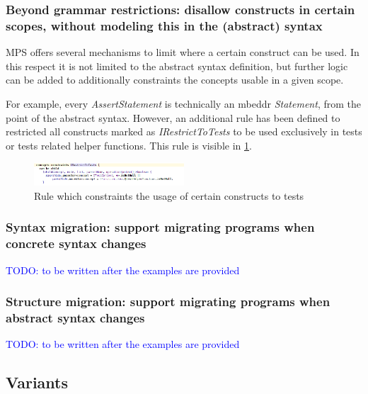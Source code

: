 \documentclass[preprint,numbers,10pt]{sigplanconf}
\newcommand\comment[1]{\textcolor{blue}{#1}}
\begin{document}
\subsubsection{Beyond grammar restrictions: disallow constructs in certain scopes, without modeling this in the (abstract) syntax}
\label{evr:beyondgrammar}

MPS offers several mechanisms to limit where a certain construct can be used. In this respect it is not limited to the abstract syntax definition, but further logic can be added to additionally constraints the concepts usable in a given scope.

For example, every \emph{AssertStatement} is technically an mbeddr \emph{Statement}, from the point of the abstract syntax. However, an additional rule has been defined to restricted all constructs marked as \emph{IRestrictToTests} to be used exclusively in tests or tests related helper functions. This rule is visible in \ref{fig:restrictedtotest}.

\begin{figure}[H]
	\centering
	\includegraphics[width=0.50\textwidth]{screens/restricted_to_test.png}
	\caption{Rule which constraints the usage of certain constructs to tests}
	\label{fig:restrictedtotest}
\end{figure}

\subsubsection{Syntax migration: support migrating programs when concrete syntax changes}
\label{evr:synmigr}

\comment{TODO: to be written after the examples are provided}

\subsubsection{Structure migration: support migrating programs when abstract syntax changes}
\label{evr:structmigr}

\comment{TODO: to be written after the examples are provided}

\subsection{Variants}
\end{document}
